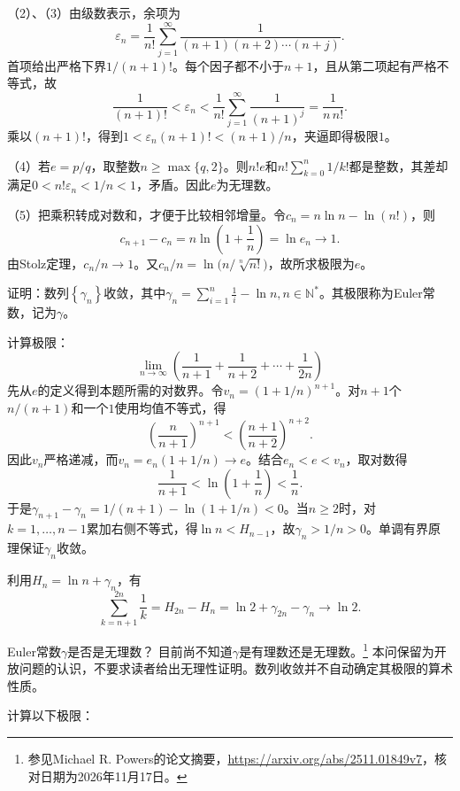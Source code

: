 （2）、（3）由级数表示，余项为
\[
\varepsilon_n=\frac1{n!}\sum_{j=1}^{\infty}
\frac1{(n+1)(n+2)\cdots(n+j)}.
\]
首项给出严格下界\(1/(n+1)!\)。每个因子都不小于\(n+1\)，且从第二项起有严格不等式，故
\[
\frac1{(n+1)!}<\varepsilon_n
<\frac1{n!}\sum_{j=1}^{\infty}\frac1{(n+1)^j}
=\frac1{n\,n!}.
\]
乘以\((n+1)!\)，得到\(1<\varepsilon_n(n+1)!<(n+1)/n\)，夹逼即得极限\(1\)。

（4）若\(e=p/q\)，取整数\(n\ge\max\{q,2\}\)。则\(n!e\)和\(n!\sum_{k=0}^n1/k!\)都是整数，其差却满足\(0<n!\varepsilon_n<1/n<1\)，矛盾。因此\(e\)为无理数。

（5）把乘积转成对数和，才便于比较相邻增量。令\(c_n=n\ln n-\ln(n!)\)，则
\[
c_{n+1}-c_n=n\ln\left(1+\frac1n\right)=\ln e_n\to1.
\]
由Stolz定理，\(c_n/n\to1\)。又\(c_n/n=\ln\bigl(n/\sqrt[n]{n!}\bigr)\)，故所求极限为\(e\)。


证明：数列\(\left\{ \gamma_{n} \right\}\)收敛，其中\(\gamma_{n} = \sum _{i = 1}^{n} \frac{1}{i} - \ln n , n \in \mathbb{N}^{*}\)。其极限称为{\heiti{}Euler常数}，记为\(\gamma\)。

计算极限：
\begin{equation*}
    \lim_{n \to \infty} \left( \frac{1}{n + 1} + \frac{1}{n + 2} + \cdots + \frac{1}{2 n} \right)
\end{equation*}
\solutionanswer
先从\(e\)的定义得到本题所需的对数界。令\(v_n=(1+1/n)^{n+1}\)。对\(n+1\)个\(n/(n+1)\)和一个\(1\)使用均值不等式，得
\[
\left(\frac n{n+1}\right)^{n+1}
<\left(\frac{n+1}{n+2}\right)^{n+2}.
\]
因此\(v_n\)严格递减，而\(v_n=e_n(1+1/n)\to e\)。结合\(e_n<e<v_n\)，取对数得
\[
\frac1{n+1}<\ln\left(1+\frac1n\right)<\frac1n.
\]
于是\(\gamma_{n+1}-\gamma_n=1/(n+1)-\ln(1+1/n)<0\)。当\(n\ge2\)时，对\(k=1,\ldots,n-1\)累加右侧不等式，得\(\ln n<H_{n-1}\)，故\(\gamma_n>1/n>0\)。单调有界原理保证\(\gamma_n\)收敛。

利用\(H_n=\ln n+\gamma_n\)，有
\[
\sum_{k=n+1}^{2n}\frac1k=H_{2n}-H_n
=\ln2+\gamma_{2n}-\gamma_n\to\ln2.
\]


Euler常数\(\gamma\)是否是无理数？
\solutionanswer
目前尚不知道\(\gamma\)是有理数还是无理数。\footnote{参见Michael R. Powers的论文摘要，\url{https://arxiv.org/abs/2511.01849v7}，核对日期为2026年11月17日。}
本问保留为开放问题的认识，不要求读者给出无理性证明。数列收敛并不自动确定其极限的算术性质。


计算以下极限：

